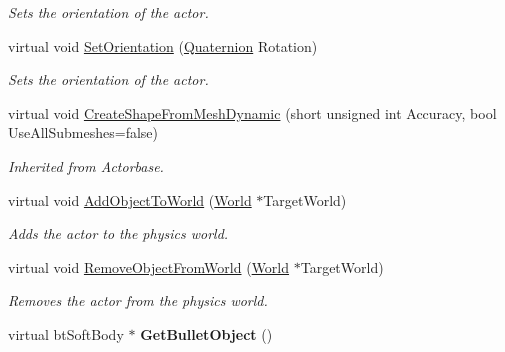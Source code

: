 \begin{DoxyCompactItemize}
\begin{DoxyCompactList}\small\item\em Sets the orientation of the actor. \item\end{DoxyCompactList}\item 
virtual void \hyperlink{classphys_1_1ActorSoft_ad57b502da0658de31a4b3a9bb9be7900}{SetOrientation} (\hyperlink{classphys_1_1Quaternion}{Quaternion} Rotation)
\begin{DoxyCompactList}\small\item\em Sets the orientation of the actor. \item\end{DoxyCompactList}\item 
\hypertarget{classphys_1_1ActorSoft_a65e5590d1fe4c11e2214d5e6a3d1fc96}{
virtual void \hyperlink{classphys_1_1ActorSoft_a65e5590d1fe4c11e2214d5e6a3d1fc96}{CreateShapeFromMeshDynamic} (short unsigned int Accuracy, bool UseAllSubmeshes=false)}
\label{d4/d23/classphys_1_1ActorSoft_a65e5590d1fe4c11e2214d5e6a3d1fc96}

\begin{DoxyCompactList}\small\item\em Inherited from Actorbase. \item\end{DoxyCompactList}\item 
virtual void \hyperlink{classphys_1_1ActorSoft_a5f97915d1cda0d048853718714a26d93}{AddObjectToWorld} (\hyperlink{classphys_1_1World}{World} $\ast$TargetWorld)
\begin{DoxyCompactList}\small\item\em Adds the actor to the physics world. \item\end{DoxyCompactList}\item 
virtual void \hyperlink{classphys_1_1ActorSoft_ab65d106fcc1ee5243a990e7b42326bf0}{RemoveObjectFromWorld} (\hyperlink{classphys_1_1World}{World} $\ast$TargetWorld)
\begin{DoxyCompactList}\small\item\em Removes the actor from the physics world. \item\end{DoxyCompactList}\item 
\hypertarget{classphys_1_1ActorSoft_a33b3fa2d6fcbb4e742e53fbde22f21a9}{
virtual btSoftBody $\ast$ {\bfseries GetBulletObject} ()}
\label{d4/d23/classphys_1_1ActorSoft_a33b3fa2d6fcbb4e742e53fbde22f21a9}

\end{DoxyCompactItemize}
